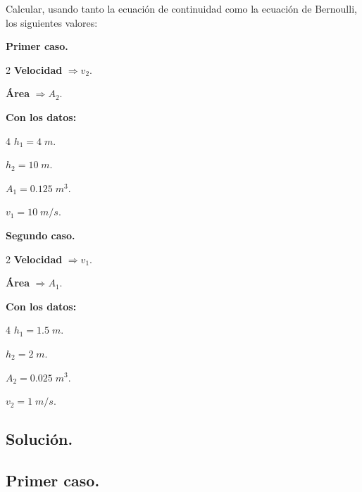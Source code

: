 \documentclass[a4paper,12pt]{article} %
\begin{document}
\begin{justify}
    Calcular, usando tanto la ecuación de continuidad como la ecuación de Bernoulli, los siguientes valores:
\end{justify}

\begin{justify}
    \textbf{Primer caso.}
\end{justify}

\begin{multicols}{2}
    \textbf{Velocidad} \(\Rightarrow v_2.\)
    
    \textbf{Área} \(\Rightarrow A_2. \)
\end{multicols}

\textbf{Con los datos:}

\begin{multicols}{4}
    \(h_1 = 4 \; m.\)
    
    \(h_2 = 10 \; m.\)

    \(A_1 = 0.125 \; m^3.\)

    \(v_1 = 10 \; m/s.\)
\end{multicols}


\begin{justify}
    \textbf{Segundo caso.}
\end{justify}

\begin{multicols}{2}
    \textbf{Velocidad} \(\Rightarrow v_1.\)
    
    \textbf{Área} \(\Rightarrow A_1. \)
\end{multicols}


\textbf{Con los datos:}


\begin{multicols}{4}
    \(h_1 = 1.5 \; m.\)
    
    \(h_2 = 2 \; m.\)

    \(A_2 = 0.025 \; m^3.\)

    \(v_2 = 1 \; m/s.\)
\end{multicols}




\subsection{Solución.}

\vspace{\baselineskip}

\subsection{Primer caso.}
\end{document}
